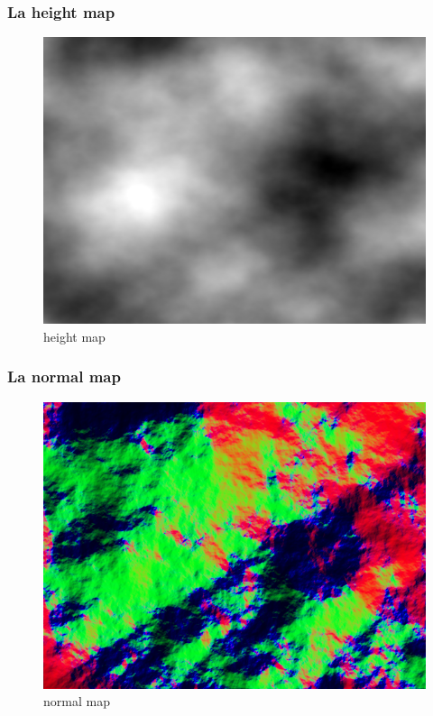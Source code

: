 \documentclass{article}
\begin{document}
\subsubsection{La height map}

\begin{figure}[h]
	\center
	\includegraphics[scale=0.30]{screen7.png}
	\caption{height map}
\end{figure}
\newpage
\subsubsection{La normal map}

\begin{figure}[h]
	\center
	\includegraphics[scale=0.30]{screen8.png}
	\caption{normal map}
\end{figure}
\end{document}
